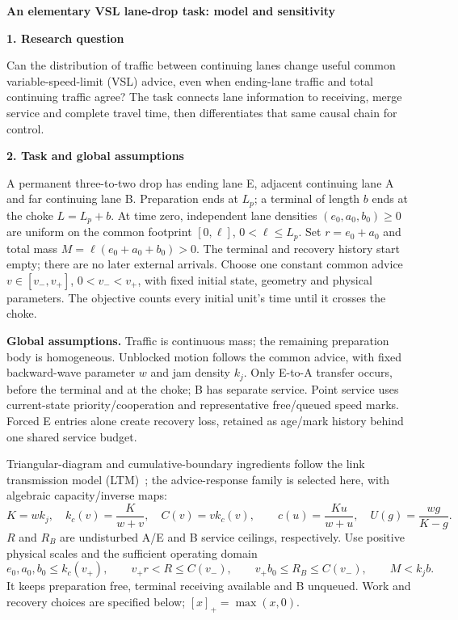 \documentclass[10pt,a4paper]{article}
\newcommand{\head}[1]{\par\vspace{4pt}\noindent\textbf{#1}\par\nobreak\vspace{1pt}}
\begin{document}
\begin{center}
{\large\bfseries An elementary VSL lane-drop task: model and sensitivity}
\end{center}
\vspace{-5pt}

\head{1. Research question}
Can the distribution of traffic between continuing lanes change useful
common variable-speed-limit (VSL) advice, even when ending-lane traffic and
total continuing traffic agree? The task connects lane information to
receiving, merge service and complete travel time, then differentiates that
same causal chain for control.

\head{2. Task and global assumptions}
A permanent three-to-two drop has ending lane E, adjacent continuing lane A
and far continuing lane B. Preparation ends at $L_p$; a terminal of length
$b$ ends at the choke $L=L_p+b$. At time zero, independent lane densities
$(e_0,a_0,b_0)\geq0$ are uniform on the common footprint $[0,\ell]$,
$0<\ell\leq L_p$. Set $r=e_0+a_0$ and total mass
$M=\ell(e_0+a_0+b_0)>0$. The terminal and recovery history start empty;
there are no later external arrivals. Choose one constant common advice
$v\in[v_-,v_+]$, $0<v_-<v_+$, with fixed initial state, geometry and physical parameters.
The objective counts every initial unit's time until it crosses the choke.

\textbf{Global assumptions.}
Traffic is continuous mass; the remaining preparation body is homogeneous.
Unblocked motion follows the common advice, with fixed backward-wave
parameter $w$ and jam density $k_j$. Only E-to-A transfer occurs, before
the terminal and at the choke; B has separate service. Point service uses
current-state priority/cooperation and representative free/queued speed
marks. Forced E entries alone create recovery loss, retained as age/mark
history behind one shared service budget.

Triangular-diagram and cumulative-boundary ingredients follow the link
transmission model (LTM)~\cite{jin}; the advice-response family is selected
here, with algebraic capacity/inverse maps:
\begin{equation}
 K=wk_j,\quad k_c(v)=\frac{K}{w+v},\quad C(v)=vk_c(v),\qquad
 c(u)=\frac{Ku}{w+u},\quad U(g)=\frac{wg}{K-g}.
 \label{eq:fd}
\end{equation}
$R$ and $R_B$ are undisturbed A/E and B service ceilings, respectively.
Use positive physical scales and the sufficient operating domain
\begin{equation}
 e_0,a_0,b_0\leq k_c(v_+),\qquad
 v_+r<R\leq C(v_-),\qquad v_+b_0\leq R_B\leq C(v_-),\qquad M<k_jb.
 \label{eq:domain}
\end{equation}
It keeps preparation free, terminal receiving available and B unqueued.
Work and recovery choices are specified below; $[x]_+=\max(x,0)$.
\end{document}
